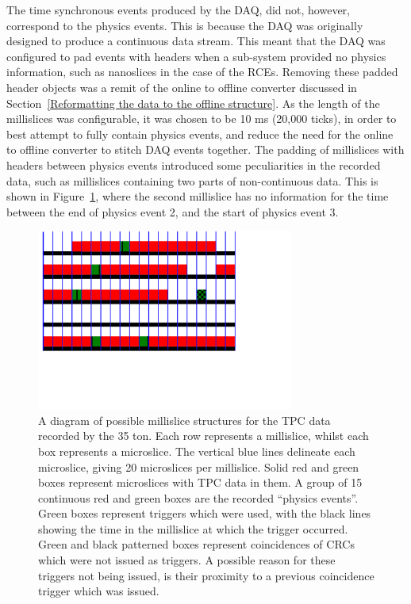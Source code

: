 The time synchronous events produced by the DAQ, did not, however, correspond to the physics events. This is because the DAQ was originally designed to produce a continuous data stream. This meant that the DAQ was configured to pad events with headers when a sub-system provided no physics information, such as nanoslices in the case of the RCEs. Removing these padded header objects was a remit of the online to offline converter discussed in Section~\ref{Reformatting the data to the offline structure}. As the length of the millislices was configurable, it was chosen to be 10 ms (20,000 ticks), in order to best attempt to fully contain physics events, and reduce the need for the online to offline converter to stitch DAQ events together. The padding of millislices with headers between physics events introduced some peculiarities in the recorded data, such as millislices containing two parts of non-continuous data. This is shown in Figure~\ref{fig:DataStructure}, where the second millislice has no information for the time between the end of physics event 2, and the start of physics event 3.\\

\begin{figure}[h!]
  \centering
  \includegraphics[width=0.75\textwidth]{DataStructure}
  \caption[The 35 ton data structure]
          {A diagram of possible millislice structures for the TPC data recorded by the 35 ton. Each row represents a millislice, whilst each box represents a microslice. The vertical blue lines delineate each microslice, giving 20 microslices per millislice. Solid red and green boxes represent microslices with TPC data in them. A group of 15 continuous red and green boxes are the recorded ``physics events''. Green boxes represent triggers which were used, with the black lines showing the time in the millislice at which the trigger occurred. Green and black patterned boxes represent coincidences of CRCs which were not issued as triggers. A possible reason for these triggers not being issued, is their proximity to a previous coincidence trigger which was issued.}
  \label{fig:DataStructure}
\end{figure}

